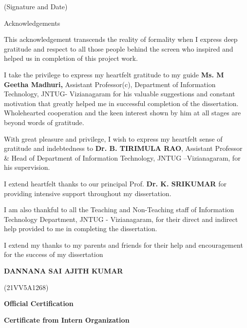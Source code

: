 \documentclass{article} %
\begin{document}
\noindent 

\noindent (Signature and Date)

\noindent 

\noindent \eject 

\noindent 

\noindent 

\noindent Acknowledgements

\noindent \textbf{}

This acknowledgement transcends the reality of formality when I express deep gratitude and respect to all those people behind the screen who inspired and helped us in completion of this project work.

I take the privilege to express my heartfelt gratitude to my guide \textbf{Ms. M Geetha Madhuri, }Assistant Professor(c), Department of Information Technology, JNTUG- Vizianagaram for his valuable suggestions and constant motivation that greatly helped me in successful completion of the dissertation. Wholehearted cooperation and the keen interest shown by him at all stages are beyond words of gratitude.

With great pleasure and privilege, I wish to express my heartfelt sense of gratitude and indebtedness to \textbf{Dr. B. TIRIMULA RAO}, Assistant Professor \& Head of Department of Information Technology, JNTUG --Vizianagaram, for his supervision.

I extend heartfelt thanks to our principal Prof. \textbf{Dr. K. SRIKUMAR }for providing intensive support throughout my dissertation.

I am also thankful to all the Teaching and Non-Teaching staff of Information Technology Department, JNTUG - Vizianagaram, for their direct and indirect help provided to me in completing the dissertation.

I extend my thanks to my parents and friends for their help and encouragement for the success of my dissertation

\noindent 

\noindent \textbf{DANNANA SAI AJITH KUMAR}

      (21VV5A1268)

\noindent 

\textbf{Official Certification}

\noindent \eject 

\noindent 

\textbf{Certificate from Intern Organization }
\end{document}
